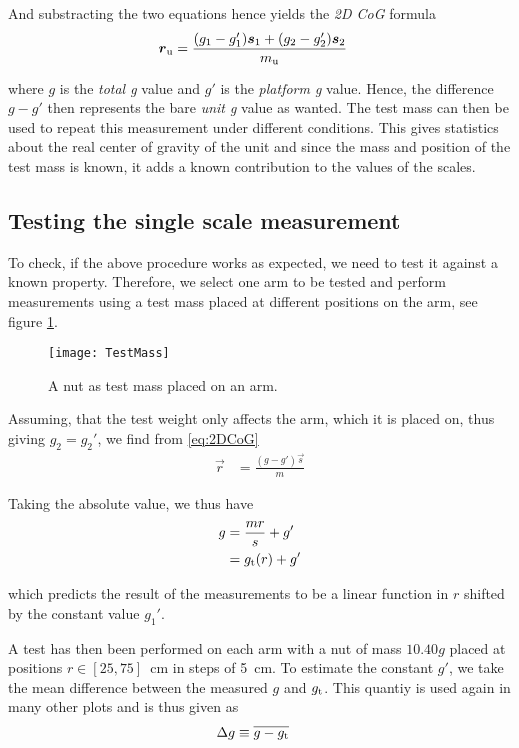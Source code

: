 \documentclass[journal]{IEEEtran}
\begin{document}
And substracting the two equations hence yields the \emph{2D CoG} formula
\begin{align}
	\vec{r}_{\textup{u}} & =  \frac{(g_1 - g_1') \vec{s}_1 + (g_2 - g_2') \vec{s}_2}{m_{\textup{u}}}
	\label{eq:2DCoG}
\end{align}

where $g$ is the \emph{total g} value and $g'$ is the \emph{platform g} value. Hence, the difference $g-g'$ then represents the bare \emph{unit g} value as wanted.
The test mass can then be used to repeat this measurement under different conditions.
This gives statistics about the real center of gravity of the unit and since the mass and position of the test mass is known, it adds a known contribution to the values of the scales.

\subsection{Testing the single scale measurement}
\label{sec:SingleScale}

To check, if the above procedure works as expected, we need to test it against a known property.
Therefore, we select one arm to be tested and perform measurements using a test mass placed at different positions on the arm, see figure \ref{fig:TestMass}.

\begin{figure}[b]
	\centering
	\texttt{[image: TestMass]}
	\caption{A nut as test mass placed on an arm.}
	\label{fig:TestMass}
\end{figure}

Assuming, that the test weight only affects the arm, which it is placed on, thus giving $g_2 = g_2'$, we find from \eqref{eq:2DCoG}
\begin{align}
	\vec{r} & = \frac{(g - g') \vec{s}}{m}
\end{align}

Taking the absolute value, we thus have
\begin{align}
	g & = \frac{m r}{s} + g'\\
	& = g_{\textup{t}}(r) + g'
	\label{eq:gt}
\end{align}

which predicts the result of the measurements to be a linear function in $r$ shifted by the constant value $g_1'$.

A test has then been performed on each arm with a nut of mass $10.40 \unit{g}$ placed at positions $r \in [25, 75]$~cm in steps of 5~cm.
To estimate the constant $g'$, we take the mean difference between the measured $g$ and $g_{\textup{t}}$.
This quantiy is used again in many other plots and is thus given as
\begin{align}
	\Delta g & \equiv \overline{g - g_{\textup{t}}}
	\label{eq:DeltaG}
\end{align}
\end{document}
